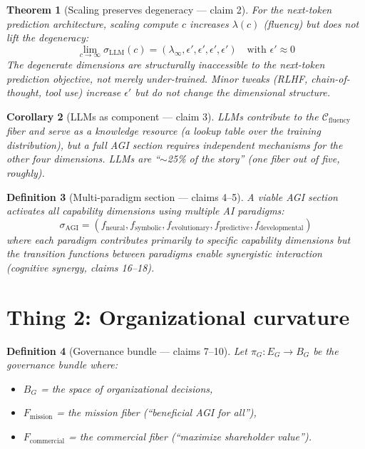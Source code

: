 \documentclass[11pt,a4paper]{article}
\newtheorem{definition}{Definition}[section]
\newtheorem{theorem}[definition]{Theorem}
\newtheorem{corollary}[definition]{Corollary}
\begin{document}
\begin{theorem}[Scaling preserves degeneracy --- claim 2]
\label{thm:scaling}
For the next-token prediction architecture, scaling compute $c$ increases
$\lambda(c)$ (fluency) but does not lift the degeneracy:
\[
  \lim_{c \to \infty} \sigma_{\text{LLM}}(c) =
  (\lambda_\infty, \epsilon', \epsilon', \epsilon', \epsilon')
  \quad \text{with } \epsilon' \approx 0
\]
The degenerate dimensions are structurally inaccessible to the
next-token prediction objective, not merely under-trained. Minor
tweaks (RLHF, chain-of-thought, tool use) increase $\epsilon'$ but
do not change the dimensional structure.
\end{theorem}

\begin{corollary}[LLMs as component --- claim 3]
LLMs contribute to the $\mathcal{C}_{\text{fluency}}$ fiber and serve
as a knowledge resource (a lookup table over the training distribution),
but a full AGI section requires independent mechanisms for the other
four dimensions. LLMs are ``$\sim$25\% of the story'' (one fiber out of
five, roughly).
\end{corollary}

\begin{definition}[Multi-paradigm section --- claims 4--5]
\label{def:multi}
A viable AGI section activates all capability dimensions using multiple
AI paradigms:
\[
  \sigma_{\text{AGI}} = (f_{\text{neural}}, f_{\text{symbolic}},
    f_{\text{evolutionary}}, f_{\text{predictive}}, f_{\text{developmental}})
\]
where each paradigm contributes primarily to specific capability dimensions
but the transition functions between paradigms enable synergistic
interaction (cognitive synergy, claims 16--18).
\end{definition}

\section{Thing 2: Organizational curvature}
\label{sec:thing2}

\begin{definition}[Governance bundle --- claims 7--10]
\label{def:gov-bundle}
Let $\pi_G : E_G \to B_G$ be the governance bundle where:
\begin{itemize}
\item $B_G$ = the space of organizational decisions,
\item $F_{\text{mission}}$ = the mission fiber (``beneficial AGI for all''),
\item $F_{\text{commercial}}$ = the commercial fiber (``maximize shareholder
  value'').
\end{itemize}
\end{definition}
\end{document}
